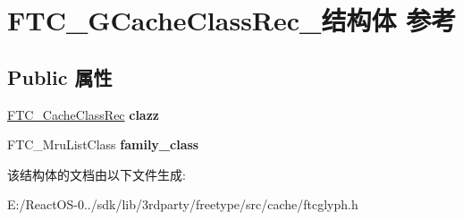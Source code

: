 \hypertarget{struct_f_t_c___g_cache_class_rec__}{}\section{F\+T\+C\+\_\+\+G\+Cache\+Class\+Rec\+\_\+结构体 参考}
\label{struct_f_t_c___g_cache_class_rec__}
\subsection*{Public 属性}
\begin{DoxyCompactItemize}
\item 
\mbox{\label{struct_f_t_c___g_cache_class_rec___a91a5ad92ca74eac46e2870622513b513}} 
\hyperlink{struct_f_t_c___cache_class_rec__}{F\+T\+C\+\_\+\+Cache\+Class\+Rec} {\bfseries clazz}
\item 
\mbox{\label{struct_f_t_c___g_cache_class_rec___a44faad0061882dfeecfa631381f65ae2}} 
F\+T\+C\+\_\+\+Mru\+List\+Class {\bfseries family\+\_\+class}
\end{DoxyCompactItemize}


该结构体的文档由以下文件生成\+:\begin{DoxyCompactItemize}
\item 
E\+:/\+React\+O\+S-\/0../sdk/lib/3rdparty/freetype/src/cache/ftcglyph.\+h\end{DoxyCompactItemize}
